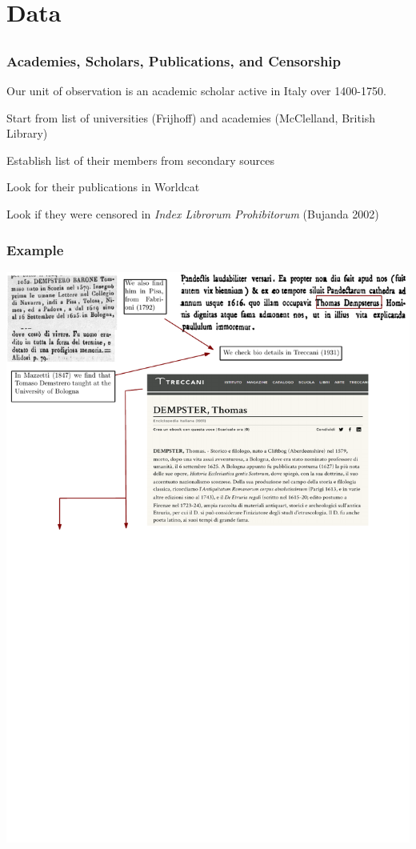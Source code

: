 \documentclass[usepdftitle=false,aspectratio=169,xcolor=dvipsnames]{beamer}
\begin{document}
	\section{Data}
	\subsection{}

	\begin{frame}
\frametitle{Academies, Scholars, Publications, and Censorship}

Our unit of observation is an academic scholar active in Italy over 1400-1750.

Start from list of universities (Frijhoff) and academies (McClelland, British Library)

Establish list of their members from secondary sources

Look for their publications in Worldcat

Look if they were censored in \textit{Index Librorum Prohibitorum} (Bujanda 2002)

\end{frame}


	\begin{frame}
\frametitle{Example}

\includegraphics[width=.75\textwidth]{dempster1.pdf}

\end{frame}
\end{document}
